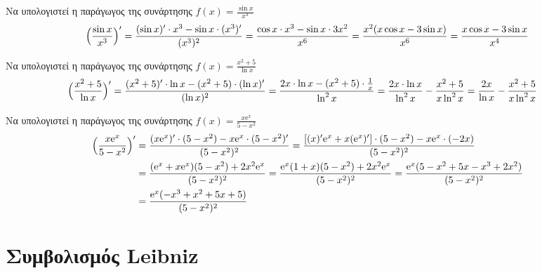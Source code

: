 \begin{exercise} Να υπολογιστεί η παράγωγος της συνάρτησης 
  $ f(x) = \frac{\sin{x}}{x^{3}} $
  \[
    \Bigl(\frac{\sin{x}}{x^{3}} \Bigr)' = \frac{(\sin{x} )' \cdot x^{3}- \sin{x} \cdot
    (x^{3})'}{(x^{3})^{2}} = \frac{\cos{x} \cdot x^{3}- \sin{x} \cdot 3x^{2}}{x^{6}} = 
    \frac{x^{2}(x \cos{x} - 3 \sin{x})}{x^{6}} = \frac{x \cos{x} - 3 \sin{x}}{x^{4}}
  \]  
\end{exercise}

\begin{exercise} Να υπολογιστεί η παράγωγος της συνάρτησης 
  $ f(x) = \frac{x^{2}+5}{\ln{x}} $
  \begin{align*}
    \Bigl(\frac{x^{2}+5}{\ln{x}} \Bigr)' 
    & = \frac{(x^{2}+5)'\cdot \ln{x} - (x^{2}+5)\cdot
      (\ln{x} )'}{(\ln{x} )^{2}} = \frac{2x \cdot \ln{x} - (x^{2}+5) \cdot
    \frac{1}{x}}{\ln^{2}{x}} = \frac{2x \cdot \ln{x}}{\ln^{2}{x}} - \frac{x^{2}+5}{x
  \ln^{2}{x}} = \frac{2x}{\ln{x}} - \frac{x^{2}+5}{x \ln^{2}{x}} 
  \end{align*}
\end{exercise}

\begin{exercise} Να υπολογιστεί η παράγωγος της συνάρτησης 
  $ f(x) = \frac{x \mathrm{e}^{x}}{5-x^{2}} $
  \begin{align*}
    \Bigl(\frac{x \mathrm{e}^{x}}{5-x^{2}} \Bigr)' 
    &= \frac{(x \mathrm{e}^{x} )'\cdot
    (5-x^{2})- x \mathrm{e}^{x} \cdot (5-x^{2})'}{(5-x^{2})^{2}} = \frac{[(x)'
    \mathrm{e}^{x} + x( \mathrm{e}^{x} )']\cdot (5-x^{2}) - x \mathrm{e}^{x}\cdot 
  (-2x)}{(5-x^{2})^{2}} \\ 
    &= \frac{(\mathrm{e}^{x} + x \mathrm{e}^{x})(5-x^{2})+2x^{2} 
    \mathrm{e}^{x}}{(5-x^{2})^{2}} 
    = \frac{\mathrm{e}^{x} (1+x)(5-x^{2})+2x^{2} \mathrm{e}^{x}}{(5-x^{2})^{2}} 
    = \frac{\mathrm{e}^{x} (5-x^{2}+5x-x^{3}+2x^{2})}{(5-x^{2})^{2}} \\
    &= \frac{\mathrm{e}^{x} (-x^{3}+x^{2}+5x+5)}{(5-x^{2})^{2}} 
  \end{align*}
\end{exercise}





\section*{Συμβολισμός Leibniz}

